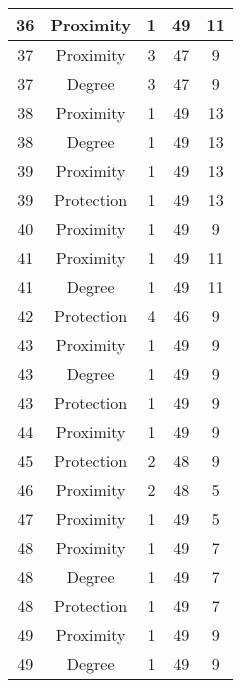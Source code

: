 \documentclass[results.tex]{subfiles}
\begin{document}
\begin{center}
\begin{tabular}{| c || c | c | c | c |}
    \hline
    36 & Proximity & 1 & 49 & 11 \\ 
    \hline
    37 & Proximity & 3 & 47 & 9 \\ 
    \hline
    37 & Degree & 3 & 47 & 9 \\ 
    \hline
    38 & Proximity & 1 & 49 & 13 \\ 
    \hline
    38 & Degree & 1 & 49 & 13 \\ 
    \hline
    39 & Proximity & 1 & 49 & 13 \\ 
    \hline
    39 & Protection & 1 & 49 & 13 \\ 
    \hline
    40 & Proximity & 1 & 49 & 9 \\ 
    \hline
    41 & Proximity & 1 & 49 & 11 \\ 
    \hline
    41 & Degree & 1 & 49 & 11 \\ 
    \hline
    42 & Protection & 4 & 46 & 9 \\ 
    \hline
    43 & Proximity & 1 & 49 & 9 \\ 
    \hline
    43 & Degree & 1 & 49 & 9 \\ 
    \hline
    43 & Protection & 1 & 49 & 9 \\ 
    \hline
    44 & Proximity & 1 & 49 & 9 \\ 
    \hline
    45 & Protection & 2 & 48 & 9 \\ 
    \hline
    46 & Proximity & 2 & 48 & 5 \\ 
    \hline
    47 & Proximity & 1 & 49 & 5 \\ 
    \hline
    48 & Proximity & 1 & 49 & 7 \\ 
    \hline
    48 & Degree & 1 & 49 & 7 \\ 
    \hline
    48 & Protection & 1 & 49 & 7 \\ 
    \hline
    49 & Proximity & 1 & 49 & 9 \\ 
    \hline
    49 & Degree & 1 & 49 & 9 \\ 
    \hline   \end{tabular}
\end{center}
\end{document}

